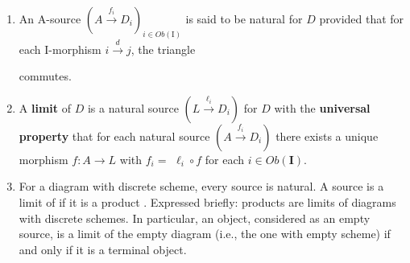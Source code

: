 \begin{enumerate}
    \item An A-source $\left(A \xrightarrow{f_i} D_i\right)_{i \in O b(\mathrm{I})}$ is said to be natural for $D$ provided that for each I-morphism $i \xrightarrow{d} j$, the triangle 
 commutes.
    \item A \textbf{limit} of $D$ is a natural source $\left(L \xrightarrow{\ell_i} D_i\right)$ for $D$ with the \textbf{universal property} that for each natural source $\left(A \xrightarrow{f_i} D_i\right)$ there exists a unique morphism $f: A \rightarrow L$ with $f_i=$ $\ell_i \circ f$ for each $i \in O b(\mathbf{I})$.

    \item For a diagram with discrete scheme, every source is natural. A source is a limit of if it is a product . Expressed briefly: products are limits of diagrams with discrete schemes. In particular, an object, considered as an empty source, is a limit of the empty diagram (i.e., the one with empty scheme) if and only if it is a terminal object.


\end{enumerate}
